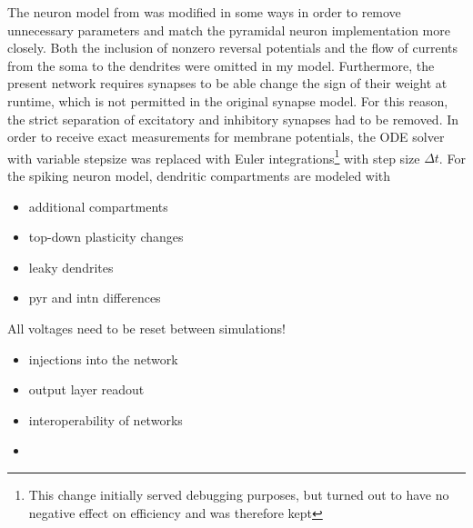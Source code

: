 The neuron model from \cite{Stapmanns2021} was modified in some ways in order to remove unnecessary parameters and match
the pyramidal neuron implementation more closely. Both the inclusion of nonzero reversal potentials and the flow of
currents from the soma to the dendrites were omitted in my model. Furthermore, the present network requires synapses to
be able change the sign of their weight at runtime, which is not permitted in the original synapse model. For this
reason, the strict separation of excitatory and inhibitory synapses had to be removed. In order to receive exact
measurements for membrane potentials, the ODE solver with variable stepsize was replaced with Euler
integrations\footnote{This change initially served debugging purposes, but turned out to have no negative effect on
efficiency and was therefore kept} with step size $\Delta t$. For the spiking neuron model, dendritic compartments are
modeled with 


\begin{itemize}
  \item additional compartments
  \item top-down plasticity changes
  \item leaky dendrites
  \item pyr and intn differences
\end{itemize}


All voltages need to be reset between simulations!

\begin{itemize}
  \item injections into the network
  \item output layer readout
  \item interoperability of networks
  \item

\end{itemize}

